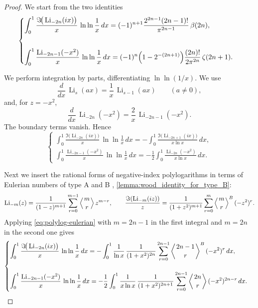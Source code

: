 \documentclass[11pt,twoside]{article}
\numberwithin{equation}{section}
\begin{document}
\begin{proof}
We start from the two identities \cite{TallaWaffo2025arxiv2511.02843}
\begin{equation}\label{eq:start}
\begin{cases}
\displaystyle
\int_{0}^{1}
\frac{\Im\!\big(\operatorname{Li}_{-2n}(ix)\big)}{x}\,
\ln\ln\frac{1}{x}\,dx
=
(-1)^{n+1}
\frac{2^{2n-1}(2n-1)!}{\pi^{2n-1}}
\,\beta(2n),
\\[2.6em]
\displaystyle
\int_{0}^{1}
\frac{\operatorname{Li}_{-2n-1}(-x^{2})}{x}\,
\ln\ln\frac{1}{x}\,dx
=
(-1)^{n}
\Bigl(1-2^{-(2n+1)}\Bigr)
\frac{(2n)!}{2\pi^{2n}}
\,\zeta(2n+1).
\end{cases}
\end{equation}

We perform integration by parts, differentiating $\ln\ln(1/x)$. We use
\[
\frac{d}{dx}\,\operatorname{Li}_s(a x)=\frac{1}{x}\,\operatorname{Li}_{s-1}(a x)\qquad (a\neq 0),
\]
and, for $z=-x^2$,
\[
\frac{d}{dx}\,\operatorname{Li}_{-2n}(-x^2)=\frac{2}{x}\,\operatorname{Li}_{-2n-1}(-x^2).
\]
The boundary terms vanish. Hence
\begin{equation}\label{eq:ibp}
\begin{cases}
\displaystyle
\int_{0}^{1}
\frac{\Im\!\big(\operatorname{Li}_{-2n}(ix)\big)}{x}\,
\ln\ln\frac{1}{x}\,dx
=
-\displaystyle
\int_{0}^{1}
\frac{\Im\!\big(\operatorname{Li}_{-2n+1}(ix)\big)}{x\ln x}\,dx,
\\[2.0em]
\displaystyle
\int_{0}^{1}
\frac{\operatorname{Li}_{-2n-1}(-x^{2})}{x}\,
\ln\ln\frac{1}{x}\,dx
=
-\displaystyle
\frac{1}{2}
\int_{0}^{1}
\frac{\operatorname{Li}_{-2n}(-x^{2})}{x\ln x}\,dx.
\end{cases}
\end{equation}

Next we insert the rational forms of negative-index polylogarithms in terms of Eulerian numbers of type A and B \cite{Wood1992Polylog}, \cref{lemma:wood_identity_for_type_B}:
\begin{equation}\label{eq:polylog-eulerian}
\operatorname{Li}_{-m}(z)=\frac{1}{(1-z)^{m+1}}\sum_{r=0}^{m-1}\left\langle{m\atop r}\right\rangle z^{m-r},
\qquad
\frac{\Im(\operatorname{Li}_{-m}(iz))}{z}=\frac{1}{(1+z^2)^{m+1}}\sum_{r=0}^{m}\left\langle{m\atop r}\right\rangle^{B}(-z^2)^r.
\end{equation}
Applying \eqref{eq:polylog-eulerian} with $m=2n-1$ in the first integral and $m=2n$ in the second one gives
\[
\begin{cases}
\displaystyle
\int_{0}^{1}
\frac{\Im\!\big(\operatorname{Li}_{-2n}(ix)\big)}{x}\,
\ln\ln\frac{1}{x}\,dx
=
-\displaystyle
\int_{0}^{1}
\frac{1}{\ln x}\,
\frac{1}{(1+x^{2})^{2n}}
\sum_{r=0}^{2n-1}
\left\langle{2n-1\atop r}\right\rangle^{B}
(-x^{2})^{r}\,dx,
\\[2.4em]
\displaystyle
\int_{0}^{1}
\frac{\operatorname{Li}_{-2n-1}(-x^{2})}{x}\,
\ln\ln\frac{1}{x}\,dx
=
-\displaystyle
\frac{1}{2}
\int_{0}^{1}
\frac{1}{x\ln x}\,
\frac{1}{(1+x^{2})^{2n+1}}
\sum_{r=0}^{2n-1}
\left\langle{2n\atop r}\right\rangle
(-x^{2})^{2n-r}\,dx.
\end{cases}
\]


\end{proof}
\end{document}
